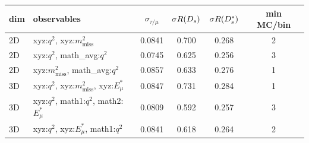 \begin{tabular}{llccc c}
\toprule
dim & observables & $\sigma_{\tau/\mu}$ & $\sigma R(D_s)$ & $\sigma R(D_s^*)$ & min MC/bin \\
\midrule
2D & xyz:$q^2$, xyz:$m^2_\text{miss}$ & 0.0841 & 0.700 & 0.268 & 2 \\
2D & xyz:$q^2$, math\_avg:$q^2$ & 0.0745 & 0.625 & 0.256 & 3 \\
2D & xyz:$m^2_\text{miss}$, math\_avg:$q^2$ & 0.0857 & 0.633 & 0.276 & 1 \\
\midrule
3D & xyz:$q^2$, xyz:$m^2_\text{miss}$, xyz:$E^*_\mu$ & 0.0847 & 0.731 & 0.284 & 1 \\
3D & xyz:$q^2$, math1:$q^2$, math2:$E^*_\mu$ & 0.0809 & 0.592 & 0.257 & 3 \\
3D & xyz:$q^2$, xyz:$E^*_\mu$, math1:$q^2$ & 0.0841 & 0.618 & 0.264 & 2 \\
\bottomrule
\end{tabular}

